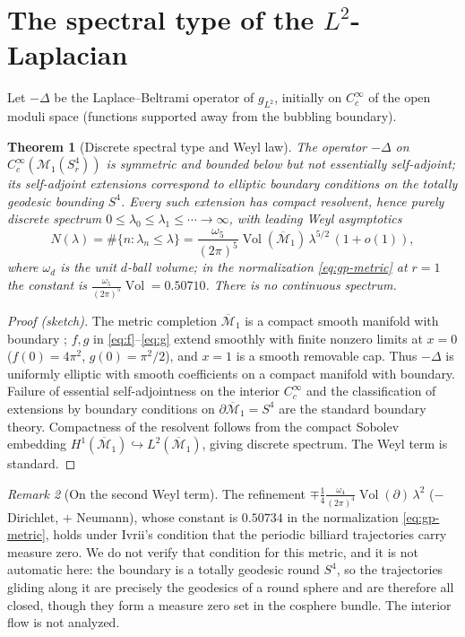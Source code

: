 \documentclass[11pt,letterpaper]{article}
\newcommand{\cM}{\mathcal{M}}
\newcommand{\Lap}{\Delta}
\DeclareMathOperator{\Vol}{Vol}
\theoremstyle{plain}
\newtheorem{theorem}{Theorem}[section]
\theoremstyle{remark}
\newtheorem{remark}[theorem]{Remark}
\begin{document}
\section{The spectral type of the $L^2$-Laplacian}\label{sec:spectral}

Let $-\Lap$ be the Laplace--Beltrami operator of $g_{L^2}$, initially on $C_c^\infty$ of the open moduli space (functions supported away from the bubbling boundary).

\begin{theorem}[Discrete spectral type and Weyl law]\label{thm:discrete}
The operator $-\Lap$ on $C_c^\infty(\cM_1(S^4_r))$ is symmetric and bounded below but not essentially self-adjoint; its self-adjoint extensions correspond to elliptic boundary conditions on the totally geodesic bounding $S^4$. Every such extension has compact resolvent, hence purely discrete spectrum $0\le\lambda_0\le\lambda_1\le\cdots\to\infty$, with leading Weyl asymptotics
\[
  N(\lambda)=\#\{n:\lambda_n\le\lambda\}
  = \frac{\omega_5}{(2\pi)^5}\Vol(\overline{\cM}_1)\,\lambda^{5/2}\,(1+o(1)),
\]
where $\omega_d$ is the unit $d$-ball volume; in the normalization \eqref{eq:gp-metric} at $r=1$ the constant is $\tfrac{\omega_5}{(2\pi)^5}\Vol = 0.50710$. There is no continuous spectrum.
\end{theorem}

\begin{proof}[Proof (sketch)]
The metric completion $\overline{\cM}_1$ is a compact smooth manifold with boundary \cite[Cor.~C]{GP1987}; $f,g$ in \eqref{eq:f}--\eqref{eq:g} extend smoothly with finite nonzero limits at $x=0$ ($f(0)=4\pi^2$, $g(0)=\pi^2/2$), and $x=1$ is a smooth removable cap. Thus $-\Lap$ is uniformly elliptic with smooth coefficients on a compact manifold with boundary. Failure of essential self-adjointness on the interior $C_c^\infty$ and the classification of extensions by boundary conditions on $\partial\overline{\cM}_1=S^4$ are the standard boundary theory. Compactness of the resolvent follows from the compact Sobolev embedding $H^1(\overline{\cM}_1)\hookrightarrow L^2(\overline{\cM}_1)$, giving discrete spectrum. The Weyl term is standard.
\end{proof}

\begin{remark}[On the second Weyl term]\label{rmk:weyl2}
The refinement $\mp\tfrac14\tfrac{\omega_4}{(2\pi)^4}\Vol(\partial)\,\lambda^{2}$ ($-$ Dirichlet, $+$ Neumann), whose constant is $0.50734$ in the normalization \eqref{eq:gp-metric}, holds under Ivrii's condition that the periodic billiard trajectories carry measure zero. We do not verify that condition for this metric, and it is not automatic here: the boundary is a totally geodesic round $S^4$, so the trajectories gliding along it are precisely the geodesics of a round sphere and are therefore all closed, though they form a measure zero set in the cosphere bundle. The interior flow is not analyzed.
\end{remark}
\end{document}
